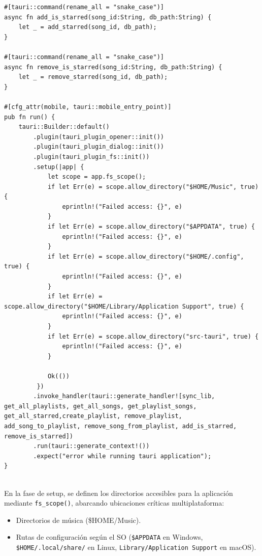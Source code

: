 \documentclass[11pt, a4paper]{article}
\begin{document}
\begin{lstlisting}[caption={lib.rs}]
#[tauri::command(rename_all = "snake_case")]
async fn add_is_starred(song_id:String, db_path:String) {
    let _ = add_starred(song_id, db_path);
}

#[tauri::command(rename_all = "snake_case")]
async fn remove_is_starred(song_id:String, db_path:String) {
    let _ = remove_starred(song_id, db_path);
}

#[cfg_attr(mobile, tauri::mobile_entry_point)]
pub fn run() {
    tauri::Builder::default()
        .plugin(tauri_plugin_opener::init())
        .plugin(tauri_plugin_dialog::init())
        .plugin(tauri_plugin_fs::init())
        .setup(|app| {
            let scope = app.fs_scope();
            if let Err(e) = scope.allow_directory("$HOME/Music", true) {
                eprintln!("Failed access: {}", e)
            }
            if let Err(e) = scope.allow_directory("$APPDATA", true) {
                eprintln!("Failed access: {}", e)
            }
            if let Err(e) = scope.allow_directory("$HOME/.config", true) {
                eprintln!("Failed access: {}", e)
            }
            if let Err(e) = scope.allow_directory("$HOME/Library/Application Support", true) {
                eprintln!("Failed access: {}", e)
            }
            if let Err(e) = scope.allow_directory("src-tauri", true) {
                eprintln!("Failed access: {}", e)
            }
            
            Ok(())
         })
        .invoke_handler(tauri::generate_handler![sync_lib, get_all_playlists, get_all_songs, get_playlist_songs, get_all_starred,create_playlist, remove_playlist, add_song_to_playlist, remove_song_from_playlist, add_is_starred, remove_is_starred])
        .run(tauri::generate_context!())
        .expect("error while running tauri application");
}
              
            \end{lstlisting}
            
            En la fase de setup, se definen los directorios accesibles para la aplicación mediante \verb|fs_scope()|, abarcando ubicaciones críticas multiplataforma:

            \begin{itemize}
              \item Directorios de música (\$HOME/Music).
              \item Rutas de configuración según el SO (\verb|$APPDATA| en Windows, \verb|$HOME/.local/share/| en Linux, \verb|Library/Application Support| en macOS).
            \end{itemize}
\end{document}

